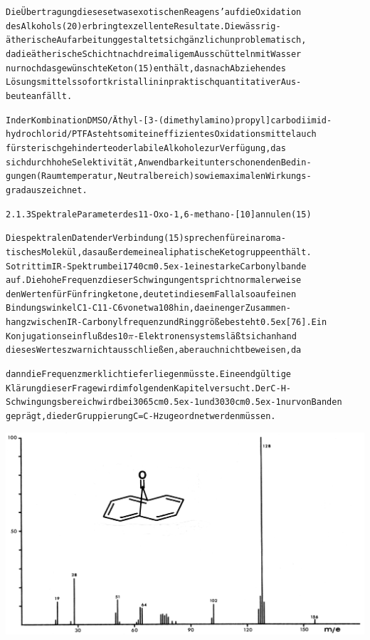 \documentclass[a4paper,11pt]{article}
\begin{document}
\begin{alltt}

Die Übertragung dieses etwas exotischen Reagens' auf die Oxidation
des Alkohols (20) erbringt exzellente Resultate. Die wässrig-
ätherische Aufarbeitung gestaltet sich gänzlich unproblematisch,
da die ätherische Schicht nach dreimaligem Ausschütteln mit Wasser
nur noch das gewünschte Keton (15) enthält, das nach Abziehen des
Lösungsmittels sofort kristallin in praktisch quantitativer Aus-
beute anfällt.

In der Kombination DMSO/Äthyl-[3-(dimethylamino)propyl]carbodiimid-
hydrochlorid/PTFA steht somit ein effizientes Oxidationsmittel auch
für sterisch gehinderte oder labile Alkohole zur Verfügung, das
sich durch hohe Selektivität, Anwendbarkeit unter schonenden Bedin-
gungen (Raumtemperatur, Neutralbereich) sowie maximalen Wirkungs-
grad auszeichnet.

2.1.3 Spektrale Parameter des 11-Oxo-1,6-methano-[10]annulen (15)

Die spektralen Daten der Verbindung (15) sprechen für ein aroma-
tisches Molekül, das außerdem eine aliphatische Ketogruppe enthält.
So tritt im IR-Spektrum bei 1740 cm\raise0.5ex\hbox{-1} eine starke Carbonylbande
auf. Die hohe Frequenz dieser Schwingung entspricht normalerweise
den Werten für Fünfringketone, deutet in diesem Fall also auf einen
Bindungswinkel C1-C11-C6 von etwa 108\degree hin, da ein enger Zusammen-
hang zwischen IR-Carbonylfrequenz und Ringgröße besteht \raise0.5ex\hbox{[76]}. Ein
Konjugationseinfluß des 10\(\pi\)-Elektronensystems läßt sich anhand
dieses Wertes zwar nicht ausschließen, aber auch nicht beweisen, da
\newpage
{}


dann die Frequenz merklich tiefer liegen müsste. Eine endgültige
Klärung dieser Frage wird im folgenden Kapitel versucht. Der C-H -
Schwingungsbereich wird bei 3065 cm\raise0.5ex\hbox{-1} und 3030 cm\raise0.5ex\hbox{-1} nur von Banden
geprägt, die der Gruppierung C=C-H zugeordnet werden müssen.

\end{alltt}
\hspace*{-0.2cm}\includegraphics[width=14.487cm]{MASS_010}
\end{document}

